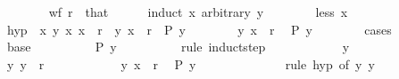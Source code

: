 \begin{isabellebody}
\ \ \ \ \ \ \isamarkupfalse%
\ {\isacartoucheopen}wf\ r{\isacartoucheclose}\ \ that\isanewline
\ \ \ \ \isamarkupfalse%
\ {\isacharparenleft}{\kern0pt}induct\ x\ arbitrary{\isacharcolon}{\kern0pt}\ y{\isacharparenright}{\kern0pt}\isanewline
\ \ \ \ \ \ \isamarkupfalse%
\ {\isacharparenleft}{\kern0pt}less\ x{\isacharparenright}{\kern0pt}\isanewline
\ \ \ \ \ \ \isamarkupfalse%
\ hyp\ {\isacharequal}{\kern0pt}\ {\isacartoucheopen}{\isasymAnd}x{\isacharprime}{\kern0pt}\ y{\isacharprime}{\kern0pt}{\isachardot}{\kern0pt}\ {\isacharparenleft}{\kern0pt}x{\isacharprime}{\kern0pt}{\isacharcomma}{\kern0pt}\ x{\isacharparenright}{\kern0pt}\ {\isasymin}\ r\ {\isasymLongrightarrow}\ {\isacharparenleft}{\kern0pt}y{\isacharprime}{\kern0pt}{\isacharcomma}{\kern0pt}\ x{\isacharprime}{\kern0pt}{\isacharparenright}{\kern0pt}\ {\isasymin}\ r\isactrlsup {\isacharplus}{\kern0pt}\ {\isasymLongrightarrow}\ P\ y{\isacharprime}{\kern0pt}{\isacartoucheclose}\isanewline
\ \ \ \ \ \ \isamarkupfalse%
\ {\isacartoucheopen}{\isacharparenleft}{\kern0pt}y{\isacharcomma}{\kern0pt}\ x{\isacharparenright}{\kern0pt}\ {\isasymin}\ r\isactrlsup {\isacharplus}{\kern0pt}{\isacartoucheclose}\ \isamarkupfalse%
\ {\isachardoublequoteopen}P\ y{\isachardoublequoteclose}\isanewline
\ \ \ \ \ \ \isamarkupfalse%
\ cases\isanewline
\ \ \ \ \ \ \ \ \isamarkupfalse%
\ base\isanewline
\ \ \ \ \ \ \ \ \isamarkupfalse%
\ {\isachardoublequoteopen}P\ y{\isachardoublequoteclose}\isanewline
\ \ \ \ \ \ \ \ \isamarkupfalse%
\ {\isacharparenleft}{\kern0pt}rule\ induct{\isacharunderscore}{\kern0pt}step{\isacharparenright}{\kern0pt}\isanewline
\ \ \ \ \ \ \ \ \ \ \isamarkupfalse%
\ y{\isacharprime}{\kern0pt}\isanewline
\ \ \ \ \ \ \ \ \ \ \isamarkupfalse%
\ {\isachardoublequoteopen}{\isacharparenleft}{\kern0pt}y{\isacharprime}{\kern0pt}{\isacharcomma}{\kern0pt}\ y{\isacharparenright}{\kern0pt}\ {\isasymin}\ r\isactrlsup {\isacharplus}{\kern0pt}{\isachardoublequoteclose}\isanewline
\ \ \ \ \ \ \ \ \ \ \isamarkupfalse%
\ {\isacartoucheopen}{\isacharparenleft}{\kern0pt}y{\isacharcomma}{\kern0pt}\ x{\isacharparenright}{\kern0pt}\ {\isasymin}\ r{\isacartoucheclose}\ \isamarkupfalse%
\ {\isachardoublequoteopen}P\ y{\isacharprime}{\kern0pt}{\isachardoublequoteclose}\isanewline
\ \ \ \ \ \ \ \ \ \ \ \ \isamarkupfalse%
\ {\isacharparenleft}{\kern0pt}rule\ hyp\ {\isacharbrackleft}{\kern0pt}of\ y\ y{\isacharprime}{\kern0pt}{\isacharbrackright}{\kern0pt}{\isacharparenright}{\kern0pt}\isanewline

\end{isabellebody}
